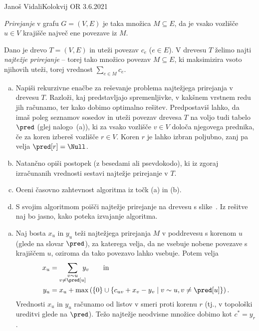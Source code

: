 \begin{naloga}{Janoš Vidali}{Kolokvij OR 3.6.2021}
\begin{vprasanje}
{\em Prirejanje} v grafu $G = (V, E)$ je taka množica $M \subseteq E$,
da je vsako vozlišče $u \in V$ krajišče največ ene povezave iz $M$.

Dano je drevo $T = (V, E)$ in uteži povezav $c_e$ ($e \in E$).
V drevesu $T$ želimo najti {\em najtežje prirejanje}
-- torej tako množico povezav $M \subseteq E$,
ki maksimizira vsoto njihovih uteži, torej vrednost $\sum_{e \in M} c_e$.

\begin{enumerate}[(a)]
\item Napiši rekurzivne enačbe za reševanje problema
najtežjega prirejanja v drevesu $T$.
Razloži, kaj pred\-stav\-lja\-jo spremenljivke,
v kakšnem vrstnem redu jih računamo, ter kako dobimo optimalno rešitev.
Predpostaviš lahko,
da imaš poleg seznamov sosedov in uteži povezav drevesa $T$
na voljo tudi tabelo $\pred$ (glej nalogo~\nal[neodvisna]{}(a)),
ki za vsako vozlišče $v \in V$ določa njegovega prednika,
če za koren izbereš vozlišče $r \in V$.
Koren $r$ je lahko izbran poljubno, zanj pa velja $\pred[r] = \Null$.

\item Natančno opiši postopek (z besedami ali psevdokodo),
ki iz zgoraj izračunanih vred\-no\-sti
sestavi najtežje prirejanje v $T$.

\item Oceni časovno zahtevnost algoritma iz točk (a) in (b).

\item S svojim algoritmom poišči najtežje prirejanje
na drevesu s slike~\fig.
Iz re\-šit\-ve naj bo jasno, kako poteka izvajanje algoritma.
\end{enumerate}
%
\begin{slika}
\makebox[\textwidth][c]{
\pgfslika
}
\end{slika}
\end{vprasanje}

\begin{odgovor}
\begin{enumerate}[(a)]
\item Naj bosta $x_u$ in $y_u$ teži najtežjega prirejanja $M$
v poddrevesu s korenom $u$ (glede na slovar $\pred$),
za katerega velja, da ne vsebuje nobene povezave s krajiščem $u$,
oziroma da tako povezavo lahko vsebuje.
Potem velja
\begin{align*}
x_u &= \sum_{\substack{v \sim u \\ v \ne \pred[u]}}\!\!\!\! y_v
\qquad \text{in} \\
y_u &= x_u + \max\left(\{0\} \cup \{c_{uv} + x_v - y_v \mid v \sim u, v \ne \pred[u]\}\right).
\end{align*}
Vrednosti $x_u$ in $y_u$ računamo od listov v smeri proti korenu $r$
(tj., v topološki ureditvi glede na $\pred$).
Težo najtežje neodvisne množice dobimo kot $c^* = y_r$.


\end{enumerate}
\end{odgovor}
\end{naloga}

